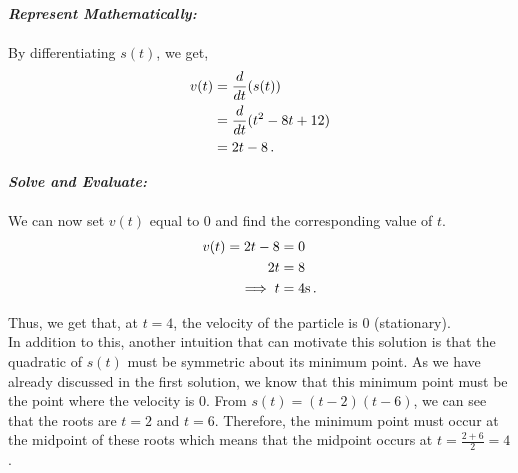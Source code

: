 \begin{subquestions}
\begin{subsubquestions}
\begin{subsubsubquestions}
			
			
			\textbf{\textit{Represent Mathematically:}} \\ \\ 
			By differentiating $s(t)$, we get,
			\begin{align}
				v(t) & = \frac{d}{dt}(s(t)) \nonumber \\
				     & = \frac{d}{dt}(t^2-8t+12) \nonumber \\
				     & = 2t - 8 \,.
			\end{align}
		
		
		
			\textbf{\textit{Solve and Evaluate:}} \\ \\
			We can now set $v(t)$ equal to 0 and find the corresponding value of $t$.
			\begin{align}
				v(t) = 2t-8 & = 0 \nonumber \\
				       2t & = 8 \nonumber \\
				       \implies t & = 4\text{s} \,.
			\end{align}
			
			Thus, we get that, at $t=4$, the velocity of the particle is 0 (stationary). \\
			
			In addition to this, another intuition that can motivate this solution is that the quadratic of $s(t)$ must be symmetric about its minimum point. As we have already discussed in the first solution, we know that this minimum point must be the point where the velocity is 0. From $s(t)=(t-2)(t-6)$, we can see that the roots are $t=2$ and $t=6$. Therefore, the minimum point must occur at the midpoint of these roots which means that the midpoint occurs at $t=\frac{2+6}{2}=4$.
		\end{subsubsubquestions}
		
	\end{subsubquestions}


\begin{subsubquestions}
	
	\subsubquestion
	

\end{subsubquestions}
\end{subquestions}
